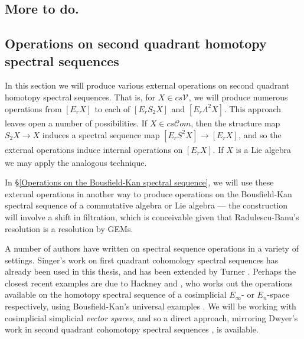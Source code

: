 \documentclass[11pt]{amsart} \renewcommand{\baselinestretch}{1.2}
\theoremstyle{plain}
\theoremstyle{definition}
\renewcommand{\to}{\longrightarrow}
\newcommand{\scrC}{\mathscr{C}}
\newcommand{\calV}{\mathcal{V}}
\newcommand{\vect}[2]{\calV^{#1}_{#2}}
\newcommand{\ExtCohOp}{\mathrm{Sq}_\mathrm{ext}}
\newcommand{\hExtCohOp}{\mathrm{Sq}_\mathrm{h,ext}}
\newcommand{\algs}{{\scrC\!\textit{om}}}
\newcommand{\E}[5]{[E^{#1}_{#2}#3]^{#4}_{#5}}
\newcommand{\uver}{^\mathrm{v}}
\newcommand{\dhor}{_\mathrm{h}}
\begin{document}
\begin{Calculations of HWn}
\subsection{More to do.}





\end{Calculations of HWn}

\begin{second quadrant homotopy sseq operations}

\section{\textbf{Operations on second quadrant homotopy spectral sequences}}
\label{second quadrant homotopy sseq operations}


In this section we will produce various external operations on second quadrant homotopy spectral sequences. That is, for $X\in cs\vect{}{}$, we will produce numerous operations
from $\E{}{r}{X}{}{}$ to each of $\E{}{r}{S_2X}{}{}$ and $\E{}{r}{\Lambda^2 X}{}{}$. This approach leaves open a number of possibilities. If $X\in cs\algs$, then the structure map $S_2X\to X$ induces a spectral sequence map $\E{}{r}{S^2X}{}{}\to \E{}{r}{X}{}{}$, and so the external operations induce internal operations on $\E{}{r}{X}{}{}$. If $X$ is a Lie algebra  we may apply the analogous technique. 

In \S\ref{Operations on the Bousfield-Kan spectral sequence}, we will use these external operations in another way to produce operations on the Bousfield-Kan spectral sequence of a commutative algebra or Lie algebra --- the construction will involve a shift in filtration, which is conceivable given that  Radulescu-Banu's resolution  is a resolution by GEMs.




A number of authors have written on spectral sequence operations in a variety of settings. Singer's work \cite{MR2245560} on first quadrant cohomology spectral sequences has already been used in this thesis, and has been extended by Turner \cite{turner_opns_and_sseqs_I.pdf}. 
 Perhaps the closest recent examples are due to Hackney \cite{MR3019742} and \cite{MR3171258}, who works out the operations available on the homotopy spectral sequence of a cosimplicial $E_\infty$- or $E_n$-space respectively, using Bousfield-Kan's universal examples \cite{BK_pairings.pdf}. We will be working with cosimplicial simplicial \emph{vector spaces}, and so a direct approach, mirroring Dwyer's work in second quadrant cohomotopy spectral sequences \cite{DwyerHigherDividedSquares.pdf}, is available. 


\end{second quadrant homotopy sseq operations}
\end{document}
